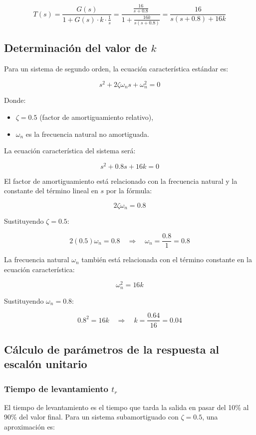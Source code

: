 \documentclass[10pt]{article}
\theoremstyle{definition}
\theoremstyle{remark}
\theoremstyle{definition}
\numberwithin{equation}{prob}
\begin{document}
\[
	T(s) = \frac{G(s)}{1 + G(s) \cdot k \cdot \frac{1}{s}} = \frac{\frac{16}{s + 0.8}}{1 + \frac{16k}{s(s + 0.8)}} = \frac{16}{s(s + 0.8) + 16k}
\]

\subsection{Determinación del valor de \texorpdfstring{\(k\)}{k}}

Para un sistema de segundo orden, la ecuación característica estándar es:

\[
	s^2 + 2\zeta \omega_n s + \omega_n^2 = 0
\]

Donde:
\begin{itemize}
	\item \(\zeta = 0.5\) (factor de amortiguamiento relativo),
	\item \(\omega_n\) es la frecuencia natural no amortiguada.
\end{itemize}

La ecuación característica del sistema será:

\[
	s^2 + 0.8s + 16k = 0
\]

El factor de amortiguamiento está relacionado con la frecuencia natural y la constante del término lineal en \(s\) por la fórmula:

\[
	2\zeta \omega_n = 0.8
\]

Sustituyendo \(\zeta = 0.5\):

\[
	2(0.5) \omega_n = 0.8 \quad \Rightarrow \quad \omega_n = \frac{0.8}{1} = 0.8
\]

La frecuencia natural \(\omega_n\) también está relacionada con el término constante en la ecuación característica:

\[
	\omega_n^2 = 16k
\]

Sustituyendo \(\omega_n = 0.8\):

\[
	0.8^2 = 16k \quad \Rightarrow \quad k = \frac{0.64}{16} = 0.04
\]

\subsection{Cálculo de parámetros de la respuesta al escalón unitario}

\subsubsection{Tiempo de levantamiento \texorpdfstring{\(t_r\)}{tr}}

El tiempo de levantamiento es el tiempo que tarda la salida en pasar del 10\% al 90\% del valor final. Para un sistema subamortiguado con \(\zeta = 0.5\), una aproximación es:
\end{document}
